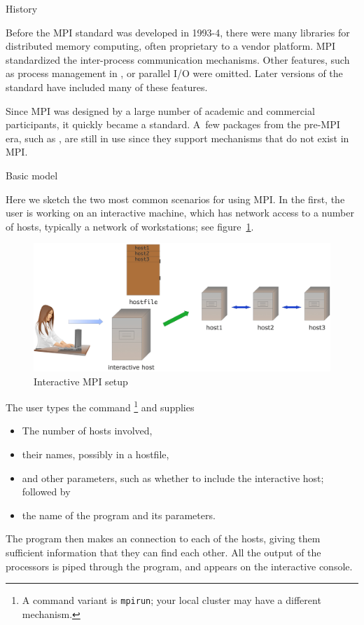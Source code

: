  {History}

Before the MPI standard was developed in 1993-4, there were many
libraries for distributed memory computing, often proprietary
to a vendor platform. MPI standardized the inter-process communication
mechanisms. Other features, such as process management in ,
or parallel I/O were omitted. Later versions of the standard
have included many of these features.

Since MPI was designed by a large number of academic and commercial
participants, it quickly became a standard. A~few packages
from the pre-MPI era, such as ,
are still in use since they support mechanisms that do not exist
in MPI.

 {Basic model}
\label{sec:mpiexec}

Here we sketch the two most common scenarios for using MPI. In the
first, the user is working on an interactive machine, which has
network access to a number of hosts, typically a network of workstations;
see figure~\ref{fig:mpi-interactive}.
\begin{figure}[ht]
  \includegraphics[scale=.12]{graphics/mpi-interactive}
  \caption{Interactive MPI setup}
  \label{fig:mpi-interactive}
\end{figure}
The user types the command \footnote
{A command variant is \texttt{mpirun}; your local cluster
  may have a different mechanism.}
and supplies
\begin{itemize}
\item The number of hosts involved,
\item their names, possibly in a hostfile,
\item and other parameters, such as whether to include the interactive
  host; followed by
\item the name of the program and its parameters.
\end{itemize}
The  program then makes an  connection
to each of the hosts, giving them sufficient information that they 
can find each other. All the output of the processors is piped through the 
 program, and appears on the interactive console.

